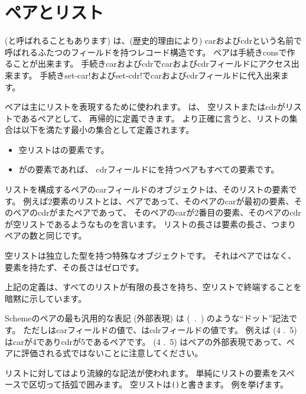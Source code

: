 \section{ペアとリスト}
\label{listsection}

 (と呼ばれることもあります)
は、(歴史的理由により) carおよびcdrという名前で呼ばれるふたつのフィールドを持つレコード構造です。
ペアは手続き{\cf cons}で作ることが出来ます。
手続き{\cf car}および{\cf cdr}でcarおよびcdrフィールドにアクセス出来ます。
手続き{\cf set-car!}および{\cf set-cdr!}でcarおよびcdrフィールドに代入出来ます。

ペアは主にリストを表現するために使われます。
は、
空リストまたはcdrがリストであるペアとして、
再帰的に定義できます。
より正確に言うと、リストの集合は以下を満たす最小の集合として定義されます。

\begin{itemize}
\item 空リストはの要素です。
\item {}がの要素であれば、
      cdrフィールドにを持つペアもすべての要素です。
\end{itemize}

リストを構成するペアのcarフィールドのオブジェクトは、そのリストの要素です。
例えば2要素のリストとは、ペアであって、そのペアのcarが最初の要素、そのペアのcdrがまたペアであって、
そのペアのcarが2番目の要素、そのペアのcdrが空リストであるようなものを言います。
リストの長さは要素の長さ、つまりペアの数と同じです。

空リストは独立した型を持つ特殊なオブジェクトです。
それはペアではなく、要素を持たず、その長さはゼロです。

\begin{note}
上記の定義は、すべてのリストが有限の長さを持ち、空リストで終端することを暗黙に示しています。
\end{note}

Schemeのペアの最も汎用的な表記 (外部表現) は
\hbox{\cf ( .\ )}
のような``ドット''記法です。
ただしはcarフィールドの値で、はcdrフィールドの値です。
例えば {\cf (4 .\ 5)} はcarが4でありcdrが5であるペアです。
{\cf (4 .\ 5)} はペアの外部表現であって、ペアに評価される式ではないことに注意してください。

リストに対してはより流線的な記法が使われます。
単純にリストの要素をスペースで区切って括弧で囲みます。
空リストは{\tt()}と書きます。
例を挙げます。

